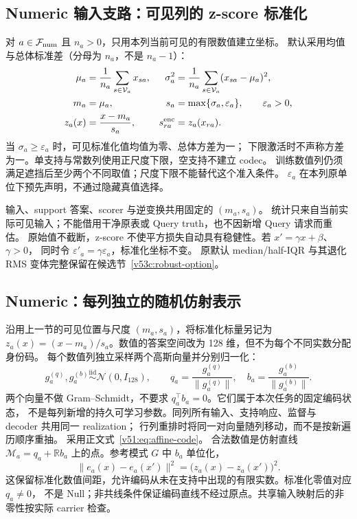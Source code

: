 \documentclass[11pt,UTF8,fontset=fandol]{ctexart}
\numberwithin{equation}{section}
\theoremstyle{definition}
\newcommand{\Fset}{\mathcal F}
\newcommand{\Vset}{\mathcal V}
\begin{document}
\subsection{Numeric 输入支路：可见列的 z-score 标准化}
对 $a\in\Fset_{\rm num}$ 且 $n_a>0$，只用本列当前可见的有限数值建立坐标。
默认采用均值与总体标准差（分母为 $n_a$，不是 $n_a-1$）：
\begin{equation}
\begin{aligned}
 \mu_a&=\frac1{n_a}\sum_{s\in\Vset_a}x_{sa},&
 \sigma_a^2&=\frac1{n_a}\sum_{s\in\Vset_a}(x_{sa}-\mu_a)^2,\\
 m_a&=\mu_a,&s_a&=\max\{\sigma_a,\varepsilon_a\},\qquad\varepsilon_a>0,\\
 z_a(x)&=\frac{x-m_a}{s_a},&s^{\rm enc}_{ra}&=z_a(x_{ra}).
\end{aligned}
\label{eq:E:numeric-prep}
\end{equation}
当 $\sigma_a\ge\varepsilon_a$ 时，可见标准化值均值为零、总体方差为一；
下限激活时不声称方差为一。单支持与常数列使用正尺度下限，空支持不建立 codec。
训练数值列仍须满足遮挡后至少两个不同取值；尺度下限不能替代这个准入条件。
$\varepsilon_a$ 在本列原单位下预先声明，不通过隐藏真值选择。

输入、support 答案、scorer 与逆变换共用固定的 $(m_a,s_a)$。
统计只来自当前实际可见输入；不能借用干净原表或 Query truth，也不因新增 Query 请求而重估。
原始值不截断，z-score 不使平方损失自动具有稳健性。若 $x'=\gamma x+\beta$、$\gamma>0$，
同时令 $\varepsilon'_a=\gamma\varepsilon_a$，标准化坐标不变。
原默认 median/half-IQR 与其退化 RMS 变体完整保留在候选节~\ref{v53c:robust-option}。


\subsection{Numeric：每列独立的随机仿射表示}

沿用上一节的可见位置与尺度 $(m_a,s_a)$，将标准化标量另记为
$z_a(x)=(x-m_a)/s_a$。数值的答案空间改为 128 维，但不为每个不同实数分配身份码。
每个数值列独立采样两个高斯向量并分别归一化：
\begin{equation}
 g_a^{(q)},g_a^{(b)}\overset{\mathrm{iid}}\sim\mathcal N(0,I_{128}),\qquad
 q_a=\frac{g_a^{(q)}}{\|g_a^{(q)}\|},\quad
 b_a=\frac{g_a^{(b)}}{\|g_a^{(b)}\|}.
 \label{v51:eq:random-directions}
\end{equation}
两个向量不做 Gram--Schmidt，不要求 $q_a^\top b_a=0$。它们属于本次任务的固定编码状态，
不是每列新增的持久可学习参数。同列所有输入、支持响应、监督与 decoder 共用同一 realization；
行列重排时将同一对向量随列移动，而不是按新遍历顺序重抽。
采用正文式~\eqref{v51:eq:affine-code}。
合法数值是仿射直线 $\mathcal M_a=q_a+\mathbb Rb_a$ 上的点。参考模式 $G$ 中 $b_a$ 单位化，
\begin{equation}
 \|e_a(x)-e_a(x')\|^2=\bigl(z_a(x)-z_a(x')\bigr)^2.
 \label{v51:eq:isometry}
\end{equation}
这保留标准化数值间距，允许编码从未在支持中出现的有限实数。标准化零值对应 $q_a\ne0$，
不是 Null；非共线条件保证编码直线不经过原点。共享输入映射后的非零性按实际 carrier 检查。
\end{document}
